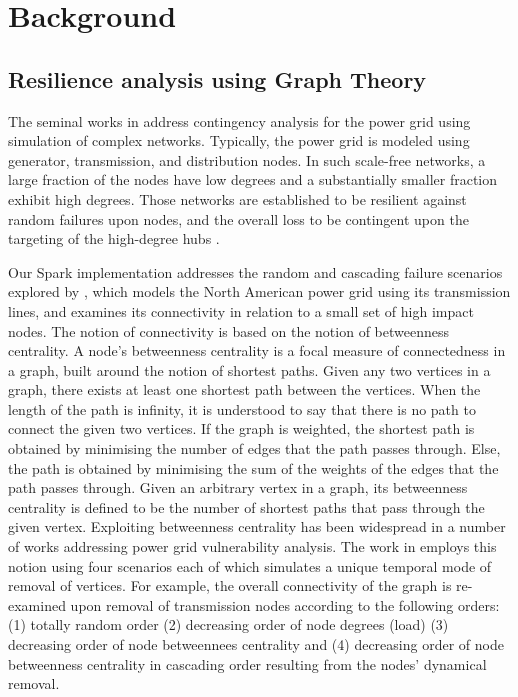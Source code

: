 \section{Background}
\label{background}

\subsection{Resilience analysis using Graph Theory}
\label{resilience}

The seminal works in \cite{2000Natur.406..378A,DaqingAl14} address contingency analysis for the power grid using simulation of complex networks. Typically, the power grid is modeled using generator, transmission, and distribution nodes. In such scale-free networks, a large fraction of the nodes have low degrees and a substantially smaller fraction exhibit high degrees. Those networks are established to be resilient against random failures upon nodes, and the overall loss to be contingent upon the targeting of the high-degree hubs \cite{AlbertAl00, CohenAl00, CohenAl01, CallawayAl00}. 

Our Spark implementation addresses the random and cascading failure scenarios explored by \cite{2000Natur.406..378A}, which models the North American power grid using its transmission lines, and examines its connectivity in relation to a small set of high impact nodes. The notion of connectivity is based on the notion of betweenness centrality. A node's betweenness centrality is a focal measure of connectedness in a graph, built around the notion of shortest paths. Given any two vertices in a graph, there exists at least one shortest path between the vertices. When the length of the path is infinity, it is understood to say that there is no path to connect the given two vertices. If the graph is weighted, the shortest path is obtained by minimising the number of edges that the path passes through. Else, the path is obtained by minimising the sum of the weights of the edges that the path passes through. Given an arbitrary vertex in a graph, its betweenness centrality is defined to be the number of shortest paths that pass through the given vertex. Exploiting betweenness centrality has been widespread in a number of works addressing power grid vulnerability analysis. The work in \cite{2000Natur.406..378A} employs this notion using four scenarios each of which simulates a unique temporal mode of removal of vertices. For example, the overall connectivity of the graph is re-examined upon removal of transmission nodes according to the following orders: (1) totally random order (2) decreasing order of node degrees (load) (3) decreasing order of node betweennees centrality and (4) decreasing order of node betweenness centrality in cascading order resulting from the nodes' dynamical removal. 

